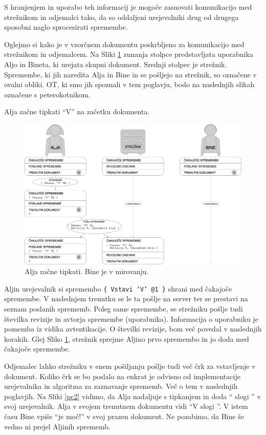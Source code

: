 \documentclass[a4paper, 12pt, twoside]{book}
\begin{document}
S hranjenjem in uporabo teh informacij je mogoče zasnovati komunikacijo med strežnikom in odjemalci tako, da so oddaljeni urejevalniki drug od drugega sposobni naglo sprocesirati spremembe.

Oglejmo si kako je v vzorčnem dokumentu poskrbljeno za komunikacijo med strežnikom in odjemalcem. Na Sliki \ref{pc1} zunanja stolpce predstavljata uporabnika Aljo in Bineta, ki urejata skupni dokument. Srednji stolpec je strežnik. Spremembe, ki jih naredita Alja in Bine in se pošljejo na strežnik, so označene v ovalni obliki. OT, ki smo jih spoznali v tem poglavju, bodo na naslednjih slikah označene s peterokotnikom.

Alja začne tipkati “V” na začetku dokumenta.

\begin{figure}[placement h]
\begin{center}
\includegraphics[width=14cm]{pc1.png}
\end{center}
\caption{Alja začne tipkati. Bine je v mirovanju.}
\label{pc1}
\end{figure}

Aljin urejevalnik si spremembo {\tt \{ Vstavi ‘V’ @1 \}} shrani med čakajoče spremembe. V naslednjem trenutku se le ta pošlje na server ter se prestavi na seznam poslanih sprememb. Poleg same spremembe, se strežniku pošlje tudi številka revizije in avtorja spremembe (uporabnika). Informacija o uporabniku je pomemba iz vidika avtentikacije. O številki revizije, bom več povedal v naslednjih korakih. Glej Sliko \ref{pc1}, strežnik sprejme Aljino prvo spremembo in jo doda med čakajoče spremembe.

Odjemalec lahko strežniku v enem pošiljanju pošlje tudi več črk za vstavljenje v dokument. Koliko črk se bo poslalo na enkrat je odvisno od implementacije urejevalnika in algoritma za zaznavanje sprememb. Več o tem v naslednjih poglavjih. Na Sliki \ref{pc2} vidimo, da Alja nadaljuje s tipkanjem in doda “ slogi ” v svoj urejevalnik. Alja v svojem trenutnem dokumentu vidi “V slogi ”. V istem času Bine vpiše “je moč!” v svoj prazen dokument. Ne pozabimo, da Bine še vedno ni prejel Aljinih sprememb.
\end{document}
